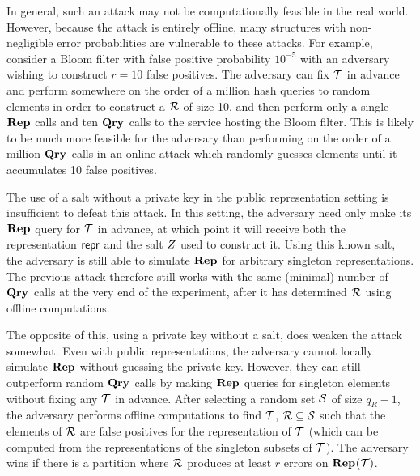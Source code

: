 In general, such an attack may not be computationally feasible in the real world. However, because the attack is entirely offline, many structures with non-negligible error probabilities are vulnerable to these attacks. For example, consider a Bloom filter with false positive probability $10^{-5}$ with an adversary wishing to construct $r = 10$ false positives. The adversary can fix $\mathcal{T}$ in advance and perform somewhere on the order of a million hash queries to random elements in order to construct a $\mathcal{R}$ of size 10, and then perform only a single $\mathbf{Rep}\hspace{0.5pt}$ calls and ten $\mathbf{Qry}\hspace{0.5pt}$ calls to the service hosting the Bloom filter. This is likely to be much more feasible for the adversary than performing on the order of a million $\mathbf{Qry}\hspace{0.5pt}$ calls in an online attack which randomly guesses elements until it accumulates 10 false positives.

The use of a salt without a private key in the public representation setting is insufficient to defeat this attack. In this setting, the adversary need only make its $\mathbf{Rep}\hspace{0.5pt}$ query for $\mathcal{T}$ in advance, at which point it will receive both the representation $\mathsf{repr}$ and the salt $Z$ used to construct it. Using this known salt, the adversary is still able to simulate $\mathbf{Rep}\hspace{0.5pt}$ for arbitrary singleton representations. The previous attack therefore still works with the same (minimal) number of $\mathbf{Qry}\hspace{0.5pt}$ calls at the very end of the experiment, after it has determined $\mathcal{R}$ using offline computations.

The opposite of this, using a private key without a salt, does weaken the attack somewhat. Even with public representations, the adversary cannot locally simulate $\mathbf{Rep}\hspace{0.5pt}$ without guessing the private key. However, they can still outperform random $\mathbf{Qry}\hspace{0.5pt}$ calls by making $\mathbf{Rep}\hspace{0.5pt}$ queries for singleton elements without fixing any $\mathcal{T}$ in advance. After selecting a random set $\mathcal{S}$ of size $q_R-1$, the adversary performs offline computations to find $\mathcal{T}$, $\mathcal{R} \subseteq \mathcal{S}$ such that the elements of $\mathcal{R}$ are false positives for the representation of $\mathcal{T}$ (which can be computed from the representations of the singleton subsets of $\mathcal{T}$). The adversary wins if there is a partition where $\mathcal{R}$ produces at least $r$ errors on $\mathbf{Rep}\hspace{0.5pt}(\mathcal{T})$.


